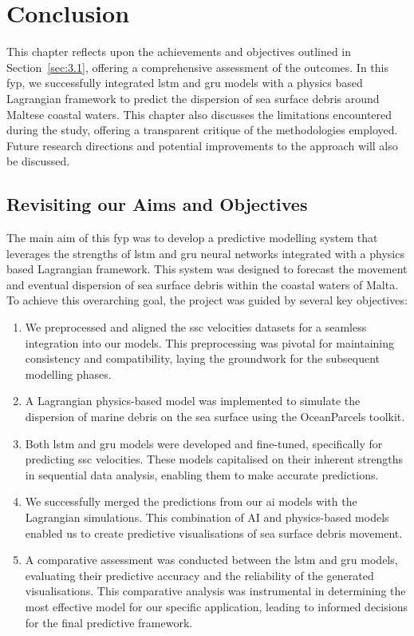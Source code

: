 \chapter{Conclusion}
\label{chp:conclusion}

This chapter reflects upon the achievements and objectives outlined in Section~\ref{sec:3.1}, offering a comprehensive assessment of the outcomes. In this \acrshort{fyp}, we successfully integrated \acrshort{lstm} and \acrshort{gru} models with a physics based Lagrangian framework to predict the dispersion of sea surface debris around Maltese coastal waters. This chapter also discusses the limitations encountered during the study, offering a transparent critique of the methodologies employed. Future research directions and potential improvements to the approach will also be discussed.

\section{Revisiting our Aims and Objectives}
\label{sec:5.1}

The main aim of this \acrshort{fyp} was to develop a predictive modelling system that leverages the strengths of \acrshort{lstm} and \acrshort{gru} neural networks integrated with a physics based Lagrangian framework. This system was designed to forecast the movement and eventual dispersion of sea surface debris within the coastal waters of  Malta. To achieve this overarching goal, the project was guided by several key objectives:

\begin{enumerate}[label=\textbf{0\arabic*.}] 
    \item We preprocessed and aligned the \acrshort{ssc} velocities datasets for a seamless integration into our models. This preprocessing was pivotal for maintaining consistency and compatibility, laying the groundwork for the subsequent modelling phases.
    \item A Lagrangian physics-based model was implemented to simulate the dispersion of marine debris on the sea surface using the OceanParcels toolkit.
    \item Both \acrshort{lstm} and \acrshort{gru} models were developed and fine-tuned, specifically for predicting \acrshort{ssc} velocities. These models capitalised on their inherent strengths in sequential data analysis, enabling them to make accurate predictions.
    \item We successfully merged the predictions from our \acrshort{ai} models with the Lagrangian simulations. This combination of AI and physics-based models enabled us to create predictive visualisations of sea surface debris movement.
    \item A comparative assessment was conducted between the \acrshort{lstm} and \acrshort{gru} models, evaluating their predictive accuracy and the reliability of the generated visualisations. This comparative analysis was instrumental in determining the most effective model for our specific application, leading to informed decisions for the final predictive framework.
\end{enumerate}

